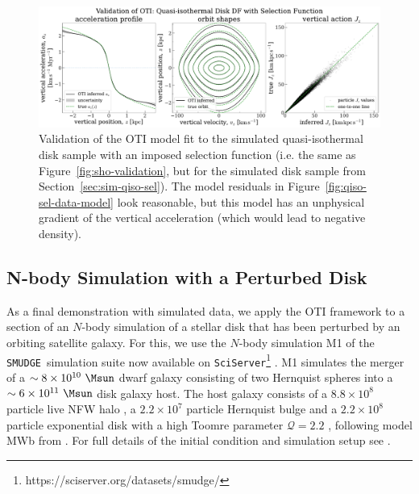 \documentclass[modern]{aastex631}
\begin{document}
\begin{figure}[t!]
\begin{center}
\includegraphics[width=\textwidth]{qiso-sel-validation.pdf}
\end{center}
\caption{%
Validation of the OTI model fit to the simulated quasi-isothermal disk sample with an
imposed selection function (i.e. the same as Figure~\ref{fig:sho-validation}, but for
the simulated disk sample from Section~\ref{sec:sim-qiso-sel}).
The model residuals in Figure~\ref{fig:qiso-sel-data-model} look reasonable, but this
model has an unphysical gradient of the vertical acceleration (which would lead to
negative density).
\label{fig:qiso-sel-validation}
}
\end{figure}


\subsection{N-body Simulation with a Perturbed Disk}
\label{sec:sim-jason}

As a final demonstration with simulated data, we apply the OTI framework to a section of
an $N$-body simulation of a stellar disk that has been perturbed by an orbiting
satellite galaxy.
For this, we use the $N$-body simulation M1 of the \texttt{SMUDGE}\ simulation suite
\cite[]{Hunt:2021} now available on
\texttt{SciServer}\footnote{https://sciserver.org/datasets/smudge/} \citep{sciserver}.
M1 simulates the merger of a $\sim8\times10^{10}~\unit{\Msun}$ dwarf galaxy consisting
of two Hernquist spheres \citep{Hernquist:1990} into a $\sim6\times10^{11}~\unit{\Msun}$
disk galaxy host.
The host galaxy consists of a $8.8\times10^8$ particle live NFW halo
\citep{Navarro:1997}, a $2.2\times10^7$ particle Hernquist bulge and a $2.2\times10^8$
particle exponential disk with a high Toomre parameter $\mathcal{Q}=2.2$
\citep{Toomre:1964}, following model MWb from \cite{Widrow:2005}.
For full details of the initial condition and simulation setup see \cite{Hunt:2021}.
\end{document}

